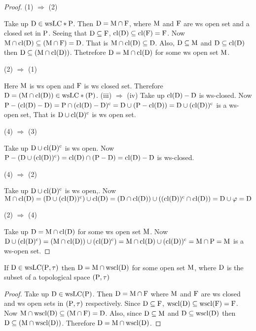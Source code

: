 \begin{proof}
(1) $\Rightarrow$ (2)

Take up $\mathrm{D} \in \mathrm{ws}\mathrm{LC} * \mathrm{P}$. Then $\mathrm{D} = \mathrm{M} \cap \mathrm{F}$, where $\mathrm{M}$ and $\mathrm{F}$ are ws open set and a closed set in $\mathrm{P}$. Seeing that $\mathrm{D} \subseteq \mathrm{F}$, $\mathrm{cl}(\mathrm{D}) \subseteq \mathrm{cl}(\mathrm{F}) = \mathrm{F}$. Now $\mathrm{M} \cap \mathrm{cl}(\mathrm{D}) \subseteq (\mathrm{M} \cap \mathrm{F}) = \mathrm{D}$. That is $\mathrm{M} \cap \mathrm{cl}(\mathrm{D}) \subseteq \mathrm{D}$. Also, $\mathrm{D} \subseteq \mathrm{M}$ and $\mathrm{D} \subseteq\mathrm{cl}(\mathrm{D})$ then $\mathrm{D} \subseteq (\mathrm{M} \cap \mathrm{cl}(\mathrm{D}))$. Thetrefore $\mathrm{D}= \mathrm{M} \cap \mathrm{cl}(\mathrm{D})$ for some ws open set $\mathrm{M}$.

(2) $\Rightarrow$ (1)

Here $\mathrm{M}$ is ws open and $\mathrm{F}$ is ws closed set. Therefore $\mathrm{D} = (\mathrm{M} \cap \mathrm{cl}(\mathrm{D})) \in \mathrm{ws}\mathrm{LC} * (\mathrm{P})$. (iii) $\Rightarrow$ (iv) Take up $\mathrm{cl}(\mathrm{D}) - \mathrm{D}$ is ws-closed. Now $\mathrm{P} - (\mathrm{cl}(\mathrm{D}) - \mathrm{D}) = \mathrm{P} \cap (\mathrm{cl}(\mathrm{D}) - \mathrm{D})^{\text{c}} = \mathrm{D} \cup (\mathrm{P} - \mathrm{cl}(\mathrm{D})) = \mathrm{D} \cup (\mathrm{cl}(\mathrm{D}))^{\text{c}}$ is a ws-open set, That is $\mathrm{D} \cup \mathrm{cl}(\mathrm{D})^{\text{c}}$ is ws open set.

(4) $\Rightarrow$ (3)

Take up $\mathrm{D} \cup \mathrm{cl}(\mathrm{D})^{\text{c}}$ is ws open. Now $\mathrm{P} - (\mathrm{D} \cup (\mathrm{cl}(\mathrm{D}))^{\text{c}}) = \mathrm{cl}(\mathrm{D}) \cap (\mathrm{P} - \mathrm{D}) = \mathrm{cl}(\mathrm{D}) - \mathrm{D}$ is ws-closed.

(4) $\Rightarrow$ (2)

Take up $\mathrm{D} \cup \mathrm{cl}(\mathrm{D})^{\text{c}}$ is ws open,. Now $\mathrm{M}\cap \mathrm{cl}(\mathrm{D}) = (\mathrm{D} \cup (\mathrm{cl}(\mathrm{D}))^{\text{c}}) \cup \mathrm{cl}(\mathrm{D}) = (\mathrm{D} \cap \mathrm{cl}(\mathrm{D})) \cup ((\mathrm{cl}(\mathrm{D}))^{\text{c}} \cap \mathrm{cl}(\mathrm{D})) = \mathrm{D} \cup \varphi = \mathrm{D}$

(2) $\Rightarrow$ (4)

Take up $\mathrm{D} = \mathrm{M} \cap \mathrm{cl}(\mathrm{D})$ for some ws open set $\mathrm{M}$. Now $\mathrm{D} \cup (\mathrm{cl}(\mathrm{D})^{\text{c}}) = (\mathrm{M} \cap \mathrm{cl}(\mathrm{D})) \cup (\mathrm{cl}(\mathrm{D})^{\text{c}}) = \mathrm{M} \cap \mathrm{cl}(\mathrm{D}) \cup (\mathrm{cl}(\mathrm{D}))^{\text{c}} = \mathrm{M} \cap \mathrm{P} = \mathrm{M}$ is a ws-open set.
\end{proof}

\begin{thm}\label{thm6.2.26}
If $\mathrm{D} \in \mathrm{ws}\mathrm{LC}(\mathrm{P}, \tau)$ then $\mathrm{D} = \mathrm{M}\cap \mathrm{ws}\mathrm{cl}(\mathrm{D})$ for some open set $\mathrm{M}$, where $\mathrm{D}$ is the subset of a topological space $(\mathrm{P}, \tau)$
\end{thm}

\begin{proof}
Take up $\mathrm{D} \in \mathrm{ws}\mathrm{LC}(\mathrm{P})$. Then $\mathrm{D} = \mathrm{M} \cap \mathrm{F}$ where $\mathrm{M}$ and $\mathrm{F}$ are ws closed and ws open sets in $(\mathrm{P},\tau)$ respectively. Since $\mathrm{D} \subseteq \mathrm{F}$, $\mathrm{ws}\mathrm{cl}(\mathrm{D}) \subseteq \mathrm{ws}\mathrm{cl}(\mathrm{F})=\mathrm{F}$. Now $\mathrm{M} \cap \mathrm{ws}\mathrm{cl}(\mathrm{D}) \subseteq (\mathrm{M} \cap \mathrm{F}) = \mathrm{D}$. Also, since $\mathrm{D} \subseteq \mathrm{M}$ and $\mathrm{D} \subseteq \mathrm{ws}\mathrm{cl}(\mathrm{D})$ then $\mathrm{D} \subseteq (\mathrm{M} \cap \mathrm{ws}\mathrm{cl}(\mathrm{D}))$. Therefore $\mathrm{D} = \mathrm{M} \cap \mathrm{ws}\mathrm{cl}(\mathrm{D})$.
\end{proof}


